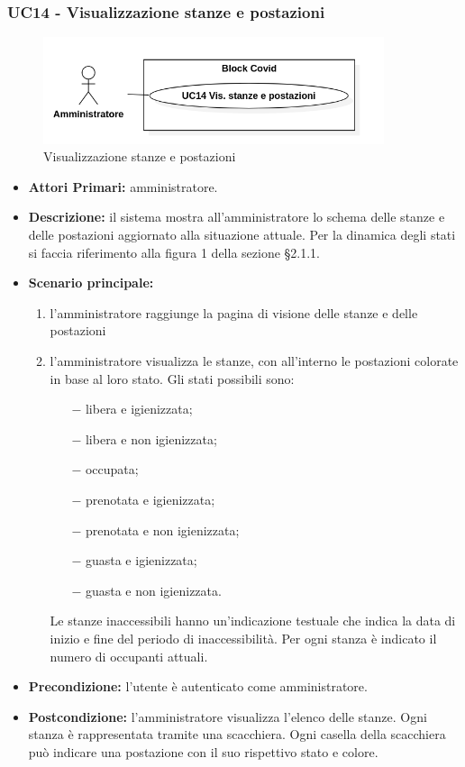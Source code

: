 \subsubsection{ UC14 - Visualizzazione stanze e postazioni}
\begin{figure}[H]
	\centering
	\includegraphics[width=10cm]{res/images/UC14.png}
	\caption{Visualizzazione stanze e postazioni}
\end{figure}
\begin{itemize}
	\item\textbf{Attori Primari:}
	amministratore.
	\item\textbf{Descrizione:}
	il sistema mostra all'amministratore lo schema delle stanze e delle postazioni aggiornato alla situazione attuale. Per la dinamica degli stati si faccia riferimento alla figura 1 della sezione §2.1.1.
	\item\textbf{Scenario principale:}
	\begin{enumerate}
		\item l'amministratore raggiunge la pagina di visione delle stanze e delle postazioni
		\item l'amministratore visualizza le stanze, con all'interno le postazioni colorate in base al loro stato. Gli stati possibili sono:
		\begin{itemize}
			\item[$-$] libera e igienizzata;
			\item[$-$] libera e non igienizzata;
			\item[$-$] occupata;
			\item[$-$] prenotata e igienizzata;
			\item[$-$] prenotata e non igienizzata;
			\item[$-$] guasta e igienizzata;
			\item[$-$] guasta e non igienizzata.
		\end{itemize}
		Le stanze inaccessibili hanno un'indicazione testuale che indica la data di inizio e fine del periodo di inaccessibilità. \newline
		Per ogni stanza è indicato il numero di occupanti attuali.
	\end{enumerate}
	
	\item\textbf{Precondizione:} 
	l'utente è autenticato come amministratore.
	\item\textbf{Postcondizione:}
	l'amministratore visualizza l'elenco delle stanze. Ogni stanza è rappresentata tramite una scacchiera. Ogni casella della scacchiera può indicare una postazione con il suo rispettivo stato e colore.
\end{itemize}


